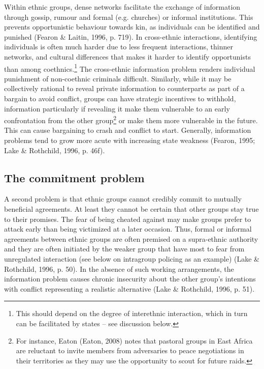 \documentclass[12pt]{article}
\begin{document}
Within ethnic groups, dense networks facilitate the exchange of information
through gossip, rumour and formal (e.g. churches) or informal institutions. This
prevents opportunistic behaviour towards kin, as individuals can be identified
and punished (Fearon \& Laitin, 1996, p. 719). In cross-ethnic interactions,
identifying individuals is often much harder due to less frequent interactions,
thinner networks, and cultural differences that makes it harder to identify
opportunists than among coethnics.\footnote{This should depend on the degree of
interethnic interaction, which in turn can be facilitated by states – see
discussion below.} The cross-ethnic information problem renders individual
punishment of non-coethnic criminals difficult. Similarly, while it may be
collectively rational to reveal private information to counterparts as part of a
bargain to avoid conflict, groups can have strategic incentives to withhold,
information particularly if revealing it make them vulnerable to an early
confrontation from the other group\footnote{For instance, Eaton (Eaton, 2008)
	notes that pastoral groups in East Africa are reluctant to invite
	members from adversaries to peace negotiations in their territories as
they may use the opportunity to scout for future raids.} or make them more
vulnerable in the future. This can cause bargaining to crash and conflict to
start. Generally, information problems tend to grow more acute with increasing
state weakness (Fearon, 1995; Lake \& Rothchild, 1996, p. 46f).

\subsection{The commitment problem}

A second problem is that ethnic groups cannot credibly commit to mutually
beneficial agreements. At least they cannot be certain that other groups stay
true to their promises. The fear of being cheated against may make groups prefer
to attack early than being victimized at a later occasion. Thus, formal or
informal agreements between ethnic groups are often premised on a supra-ethnic
authority and they are often initiated by the weaker group that have most to
fear from unregulated interaction (see below on intragroup policing as an
example) (Lake \& Rothchild, 1996, p. 50). In the absence of such working
arrangements, the information problem causes chronic insecurity about the other
group’s intentions with conflict representing a realistic alternative (Lake \&
Rothchild, 1996, p. 51).
\end{document}
